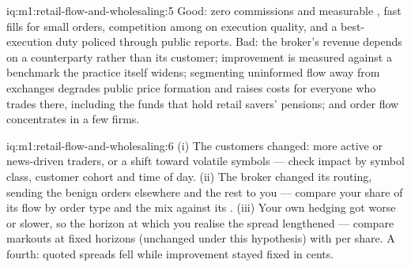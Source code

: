 \begin{solution}{iq:m1:retail-flow-and-wholesaling:5}
Good: zero commissions and measurable , fast fills for small
orders, competition among  on execution quality, and a
best-execution duty policed through public reports. Bad: the broker's revenue
depends on a counterparty rather than its customer; improvement is measured
against a benchmark the practice itself widens; segmenting uninformed flow
away from exchanges degrades public price formation and raises costs for
everyone who trades there, including the funds that hold retail savers'
pensions; and order flow concentrates in a few firms.
\end{solution}

\begin{solution}{iq:m1:retail-flow-and-wholesaling:6}
(i) The customers changed: more active or news-driven traders, or a shift
toward volatile symbols --- check impact by symbol class, customer cohort and
time of day. (ii) The broker changed its routing, sending the benign orders
elsewhere and the rest to you --- compare your share of its flow by order
type and the mix against its . (iii) Your own hedging got
worse or slower, so the horizon at which you realise the spread lengthened
--- compare markouts at fixed horizons (unchanged under this hypothesis)
with  per share. A fourth: quoted spreads fell while
improvement stayed fixed in cents.
\end{solution}
